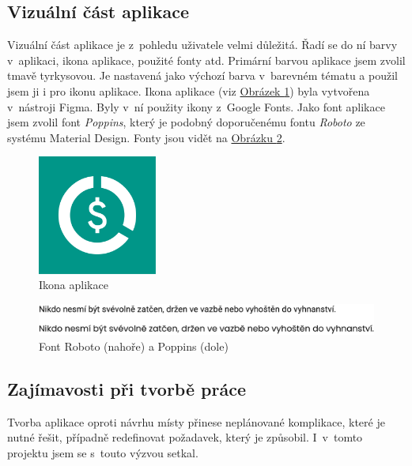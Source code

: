\documentclass[
  biblatex,
  figures=true,
  tables=false,
  glossaries,
  index
]{kidiplom}
\begin{document}
\subsection{Vizuální část aplikace}
Vizuální část aplikace je z~pohledu uživatele velmi důležitá. Řadí se do ní barvy v~aplikaci, ikona aplikace, použité fonty atd. Primární barvou aplikace jsem zvolil tmavě tyrkysovou. Je nastavená jako výchozí barva v~barevném tématu a použil jsem ji i pro ikonu aplikace. Ikona aplikace (viz \hyperref[fig:appicon]{Obrázek \ref{fig:appicon}}) byla vytvořena v~nástroji Figma. Byly v~ní použity ikony z~Google Fonts. Jako font aplikace jsem zvolil font \textit{Poppins}, který je podobný doporučenému fontu \textit{Roboto} ze systému Material Design. Fonty jsou vidět na \hyperref[fig:font]{Obrázku \ref{fig:font}}. 

\begin{figure}
  \centering
  \includegraphics[width=0.35\textwidth]{images/app-icon.pdf}
  \caption{Ikona aplikace}
  \label{fig:appicon}
\end{figure}

\begin{figure}
  \centering
  \includegraphics[width=\textwidth]{images/font-comparision.pdf}
  \caption{Font Roboto (nahoře) a Poppins (dole)}
  \label{fig:font}
\end{figure}

\subsection{Zajímavosti při tvorbě práce}
Tvorba aplikace oproti návrhu místy přinese neplánované komplikace, které je nutné řešit, případně redefinovat požadavek, který je způsobil. I~v~tomto projektu jsem se s~touto výzvou setkal.
\end{document}
